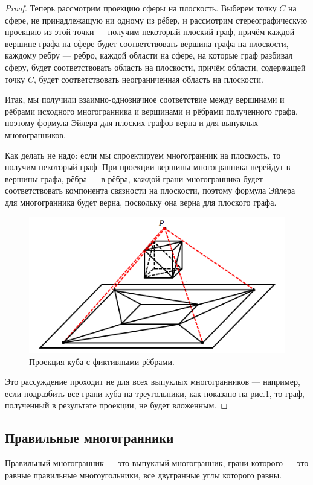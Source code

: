 \begin{proof}
    Теперь рассмотрим проекцию сферы на плоскость. Выберем точку $C$ на сфере, не принадлежащую ни одному из рёбер, и рассмотрим стереографическую проекцию из этой точки — получим некоторый плоский граф, причём каждой вершине графа на сфере будет соответствовать вершина графа на плоскости, каждому ребру — ребро, каждой области на сфере, на которые граф разбивал сферу, будет соответствовать область на плоскости, причём области, содержащей точку $C$, будет соответствовать неограниченная область на плоскости.

    Итак, мы получили взаимно-однозначное соответствие между вершинами и рёбрами исходного многогранника и вершинами и рёбрами полученного графа, поэтому формула Эйлера для плоских графов верна и для выпуклых многогранников.

    Как делать не надо: если мы спроектируем многогранник на плоскость, то получим некоторый граф. При проекции вершины многогранника перейдут в вершины графа, рёбра — в рёбра, каждой грани многогранника будет соответствовать компонента связности на плоскости, поэтому формула Эйлера для многогранника будет верна, поскольку она верна для плоского графа.

    \begin{figure}[h]
        \centering
        \includegraphics[scale=0.8]{images/c7.1.png}
        \caption{Проекция куба с фиктивными рёбрами.}
        \label{fig:c7.1}
    \end{figure}

    Это рассуждение проходит не для всех выпуклых многогранников — например, если подразбить все грани куба на треугольники, как показано на рис.\ref{fig:c7.1}, то граф, полученный в результате проекции, не будет вложенным.
\end{proof}

\subsection{Правильные многогранники}
\begin{definition}
    Правильный многогранник — это выпуклый многогранник, грани которого — это равные правильные многоугольники, все двугранные углы которого равны.
\end{definition}

